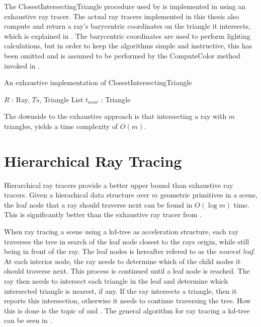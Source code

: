 

The ClosestIntersectingTriangle procedure used by 
is implemented in  using an exhaustive ray tracer. The
actual ray tracers implemented in this thesis also compute and return a ray's
barycentric coordinates on the triangle it intersects, which is explained in
. The barycentric coordinates are used to perform
lighting calculations, but in order to keep the algorithms simple and
instructive, this has been omitted and is assumed to be performed by the
ComputeColor method invoked in .


\begin{algorithm}
  \caption{An exhaustive implementation of ClosestIntersectingTriangle}
  \label{alg:exhaustive}
  \begin{algorithmic}
              {$R$ : Ray, $Ts$, Triangle List}
              {$t_{near}$ : Triangle}{
                \ENDFOR
              }
  \end{algorithmic}
\end{algorithm}

The downside to the exhaustive approach is that intersecting a ray with $m$
triangles, yields a time complexity of $O(m)$.

\section{Hierarchical Ray Tracing}\label{sec:hierarchicalTraversal}


Hierarchical ray tracers provide a better upper bound than exhaustive ray
tracers. Given a hierachical data structure over $m$ geometric primitives in a
scene, the leaf node that a ray should traverse next can be found in $O(\log m)$
time. This is significantly better than the exhaustive ray tracer from
.


When ray tracing a scene using a kd-tree as acceleration structure, each ray
traverses the tree in search of the leaf node closest to the rays origin, while
still being in front of the ray. The leaf nodes is hereafter refered to as the
\textit{nearest leaf}. At each interior node, the ray needs to determine which
of the child nodes it should traverse next. This process is continued until a
leaf node is reached. The ray then needs to intersect each triangle in the leaf
and determine which intersected triangle is nearest, if any. If the ray
intersects a triangle, then it reports this intersection, otherwise it needs to
continue traversing the tree. How this is done is the topic of
 and . The general
algorithm for ray tracing a kd-tree can be seen in .

